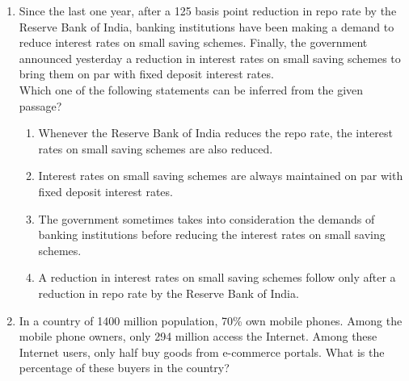 \documentclass[journal,,12pt,onecolumn]{IEEEtran}
\theoremstyle{remark}
\begin{document}
\begin{enumerate}
\bigskip




    \item Since the last one year, after a 125 basis point reduction in repo rate by the Reserve Bank of India, banking institutions have been making a demand to reduce interest rates on small saving schemes. Finally, the government announced yesterday a reduction in interest rates on small saving schemes to bring them on par with fixed deposit interest rates.\\
    Which one of the following statements can be inferred from the given passage?\\
    \begin{enumerate}
        \item Whenever the Reserve Bank of India reduces the repo rate, the interest rates on small saving schemes are also reduced.
        \item Interest rates on small saving schemes are always maintained on par with fixed deposit interest rates.
        \item The government sometimes takes into consideration the demands of banking institutions before reducing the interest rates on small saving schemes.
        \item A reduction in interest rates on small saving schemes follow only after a reduction in repo rate by the Reserve Bank of India.
    \end{enumerate}
    \bigskip

    \item In a country of 1400 million population, 70\% own mobile phones. Among the mobile phone owners, only 294 million access the Internet. Among these Internet users, only half buy goods from e-commerce portals. What is the percentage of these buyers in the country?\\
    \begin{enumerate}
    \end{enumerate}
    \bigskip


\end{enumerate}
\end{document}
